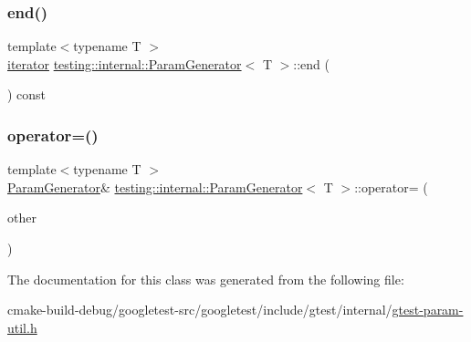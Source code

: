 \mbox{\label{classtesting_1_1internal_1_1ParamGenerator_aaf8f75df1099a07ff771a550b48f9fbe}} 
\subsubsection{\texorpdfstring{end()}{end()}}
{\footnotesize\ttfamily template$<$typename T $>$ \\
\mbox{\hyperlink{classtesting_1_1internal_1_1ParamGenerator_a448b08a8eaae1f1d27840d4dbd66c357}{iterator}} \mbox{\hyperlink{classtesting_1_1internal_1_1ParamGenerator}{testing\+::internal\+::\+Param\+Generator}}$<$ T $>$\+::end (\begin{DoxyParamCaption}{ }\end{DoxyParamCaption}) const\hspace{0.3cm}{\ttfamily [inline]}}

\mbox{\label{classtesting_1_1internal_1_1ParamGenerator_a590a03c6e0a3a3ac6279943ad1f01dc8}} 
\subsubsection{\texorpdfstring{operator=()}{operator=()}}
{\footnotesize\ttfamily template$<$typename T $>$ \\
\mbox{\hyperlink{classtesting_1_1internal_1_1ParamGenerator}{Param\+Generator}}\& \mbox{\hyperlink{classtesting_1_1internal_1_1ParamGenerator}{testing\+::internal\+::\+Param\+Generator}}$<$ T $>$\+::operator= (\begin{DoxyParamCaption}\item[{const \mbox{\hyperlink{classtesting_1_1internal_1_1ParamGenerator}{Param\+Generator}}$<$ T $>$ \&}]{other }\end{DoxyParamCaption})\hspace{0.3cm}{\ttfamily [inline]}}



The documentation for this class was generated from the following file\+:\begin{DoxyCompactItemize}
\item 
cmake-\/build-\/debug/googletest-\/src/googletest/include/gtest/internal/\mbox{\hyperlink{gtest-param-util_8h}{gtest-\/param-\/util.\+h}}\end{DoxyCompactItemize}
